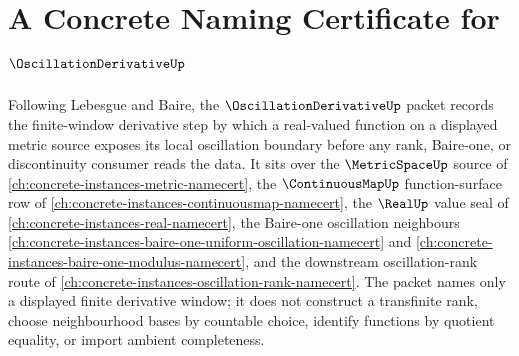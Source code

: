 \chapter{A Concrete Naming Certificate for $\OscillationDerivativeUp$}
\label{ch:concrete-instances-oscillation-derivative-namecert}

Following Lebesgue and Baire, the $\OscillationDerivativeUp$ packet records the finite-window derivative step by which a real-valued function on a displayed metric source exposes its local oscillation boundary before any rank, Baire-one, or discontinuity consumer reads the data. It sits over the $\MetricSpaceUp$ source of \autoref{ch:concrete-instances-metric-namecert}, the $\ContinuousMapUp$ function-surface row of \autoref{ch:concrete-instances-continuousmap-namecert}, the $\RealUp$ value seal of \autoref{ch:concrete-instances-real-namecert}, the Baire-one oscillation neighbours \autoref{ch:concrete-instances-baire-one-uniform-oscillation-namecert} and \autoref{ch:concrete-instances-baire-one-modulus-namecert}, and the downstream oscillation-rank route of \autoref{ch:concrete-instances-oscillation-rank-namecert}. The packet names only a displayed finite derivative window; it does not construct a transfinite rank, choose neighbourhood bases by countable choice, identify functions by quotient equality, or import ambient completeness.

